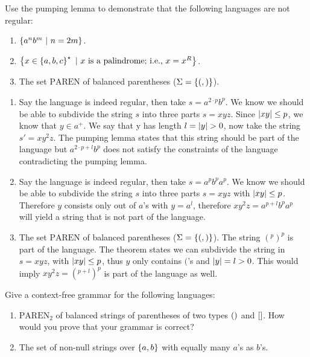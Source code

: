 \documentclass{article}
\begin{document}
\begin{exercise}
Use the pumping lemma to demonstrate that the following languages are not regular:
\begin{enumerate}
 \item $\left\{ a^nb^m\ |\ n = 2m \right\}$.
 \item $\left\{ x\in\left\{ a,b,c \right\}^{\star}\ |\ \mbox{$x$ is a palindrome; i.e., $x=x^R$} \right\}$.
 \item The set $\mbox{PAREN}$ of balanced parentheses ($\Sigma=\left\{ (,) \right\}$).
\end{enumerate}
\begin{answer}
\begin{enumerate}
 \item Say the language is indeed regular, then take $s=a^{2\cdot p}b^p$. We know we should be able to subdivide the string $s$ into three parts $s=xyz$. Since $\left|xy\right|\leq p$, we know that $y\in a^+$. We say that y has length $l=\abs{y}>0$, now take the string $s'=xy^2z$. The pumping lemma states that this string should be part of the language but $a^{2\cdot p+l}b^p$ does not satisfy the constraints of the language contradicting the pumping lemma.
 \item Say the language is indeed regular, then take $s=a^pb^pa^p$. We know we should be able to subdivide the string $s$ into three parts $s=xyz$ with $\left|xy\right|\leq p$. Therefore $y$ consists only out of $a$'s with $y=a^l$, therefore $xy^2z=a^{p+l}b^pa^p$ will yield a string that is not part of the language.
 \item The set $\mbox{PAREN}$ of balanced parentheses ($\Sigma=\left\{ (,) \right\}$). The string $(^p)^p$ is part of the language. The theorem states we can subdivide the string in $s=xyz$, with $\left|xy\right|\leq p$, thus $y$ only contains $($'s and $\left|y\right|=l>0$. This would imply $xy^2z=(^{p+l})^{p}$ is part of the language as well.
\end{enumerate}
\end{answer}
\end{exercise}
\begin{exercise}
Give a context-free grammar for the following languages:
\begin{enumerate}
 \item $\mbox{PAREN}_2$ of balanced strings of parentheses of two types $\left(  \right)$ and $\left[  \right]$. How would you prove that your grammar is correct?
 \item The set of non-null strings over $\left\{ a,b \right\}$ with equally many $a$'s as $b$'s.
\end{enumerate}
\begin{answer}
\end{answer}
\end{exercise}
\end{document}
